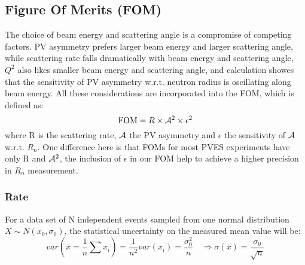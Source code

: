 \subsection{Figure Of Merits (FOM)}
The choice of beam energy and scattering angle is a compromise of competing
factors. PV asymmetry prefers larger beam energy and larger scattering angle,
while scattering rate falls dramatically with beam energy and scattering angle,
$Q^2$ also likes smaller beam energy and scattering angle, and calculation 
showes that the sensitivity of PV asymmetry w.r.t. neutron radius is oscillating
along beam energy. All these considerations are incorporated into the FOM, which
is defined as:
\begin{equation*}
    \text{FOM} = R \times \mathcal{A}^2 \times \epsilon^2
\end{equation*}
where R is the scattering rate, $\mathcal{A}$ the PV asymmetry and $\epsilon$ 
the sensitivity of $\mathcal{A}$ w.r.t. $R_n$. One difference here is that FOMs for most PVES 
experiments have only R and $\mathcal{A}^2$, the inclusion of $\epsilon$ in our FOM help
to achieve a higher precision in $R_n$ measurement.

\subsubsection{Rate}
For a data set of N independent events sampled from one normal distribution 
$X\sim N(x_0, \sigma_0)$, the statistical uncertainty on the measured mean value
will be:
$$ var(\bar{x} = \frac{1}{n}\sum x_i) = \frac{1}{n^2}var(x_i) = \frac{\sigma_0^2}{n} 
\quad \Longrightarrow \sigma(\bar{x}) = \frac{\sigma_0}{\sqrt{n}} $$


